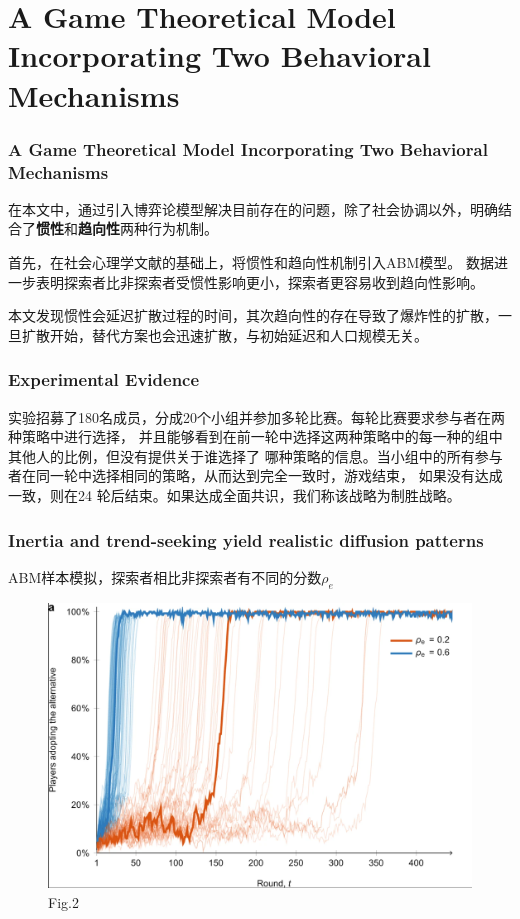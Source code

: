 \documentclass{beamer}
\begin{document}
\section{A Game Theoretical Model Incorporating Two Behavioral Mechanisms}
\begin{frame}
	\sectionpage
\end{frame}
	\begin{frame}
		\frametitle{A Game Theoretical Model Incorporating Two Behavioral Mechanisms}	
		\setlength{\parindent}{2em} 
		\addtolength{\parskip}{6pt}
		在本文中，通过引入博弈论模型解决目前存在的问题，除了社会协调以外，明确结合了\textbf{\textbf{惯性}}和\textbf{趋向性}两种行为机制。
				
		首先，在社会心理学文献的基础上，将惯性和趋向性机制引入ABM模型。
		数据进一步表明探索者比非探索者受惯性影响更小，探索者更容易收到趋向性影响。
		
		本文发现惯性会延迟扩散过程的时间，其次趋向性的存在导致了爆炸性的扩散，一旦扩散开始，替代方案也会迅速扩散，与初始延迟和人口规模无关。
	\end{frame}


	\begin{frame}
	\frametitle{Experimental Evidence}
	实验招募了180名成员，分成20个小组并参加多轮比赛。每轮比赛要求参与者在两种策略中进行选择，
	并且能够看到在前一轮中选择这两种策略中的每一种的组中其他人的比例，但没有提供关于谁选择了
	哪种策略的信息。当小组中的所有参与者在同一轮中选择相同的策略，从而达到完全一致时，游戏结束，
	如果没有达成一致，则在24 轮后结束。如果达成全面共识，我们称该战略为制胜战略。
	\end{frame}


	\begin{frame}
	\frametitle{Inertia and trend-seeking yield realistic diffusion patterns}
	ABM样本模拟，探索者相比非探索者有不同的分数$\rho_e$
	
    \begin{figure} [htpb]  
	\begin{center} 
		\includegraphics [width=0.7 \linewidth]{fig2.png}	     
	\end{center}
    \caption{Fig.2} \label{f1:1} 
	\end{figure}
	\end{frame}
\end{document}
